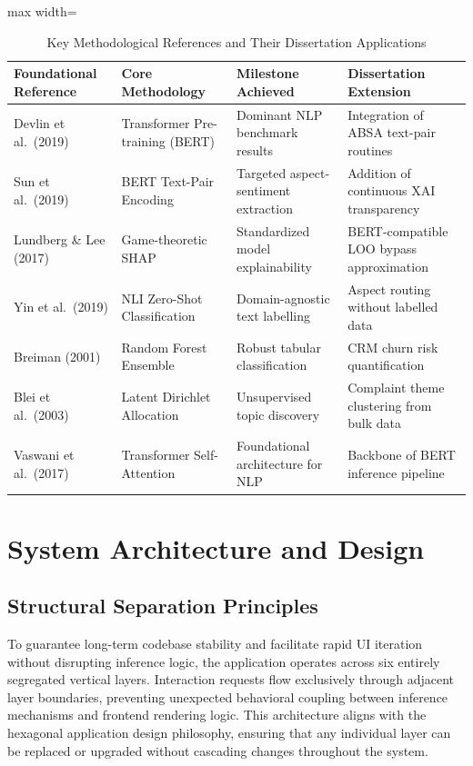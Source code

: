 \documentclass[12pt,a4paper]{report}
\begin{document}
\begin{table}[H]
\centering
\caption{Key Methodological References and Their Dissertation Applications}
\label{tab:litsurvey}
\begin{adjustbox}{max width=\textwidth}
\begin{tabular}{@{}p{4.5cm}p{3.2cm}p{4.0cm}p{4.0cm}@{}}
\toprule
\textbf{Foundational Reference} & \textbf{Core Methodology} & \textbf{Milestone Achieved} & \textbf{Dissertation Extension} \\
\midrule
Devlin et al.\ (2019) & Transformer Pre-training (BERT) & Dominant NLP benchmark results & Integration of ABSA text-pair routines \\[4pt]
Sun et al.\ (2019) & BERT Text-Pair Encoding & Targeted aspect-sentiment extraction & Addition of continuous XAI transparency \\[4pt]
Lundberg \& Lee (2017) & Game-theoretic SHAP & Standardized model explainability & BERT-compatible LOO bypass approximation \\[4pt]
Yin et al.\ (2019) & NLI Zero-Shot Classification & Domain-agnostic text labelling & Aspect routing without labelled data \\[4pt]
Breiman (2001) & Random Forest Ensemble & Robust tabular classification & CRM churn risk quantification \\[4pt]
Blei et al.\ (2003) & Latent Dirichlet Allocation & Unsupervised topic discovery & Complaint theme clustering from bulk data \\[4pt]
Vaswani et al.\ (2017) & Transformer Self-Attention & Foundational architecture for NLP & Backbone of BERT inference pipeline \\
\bottomrule
\end{tabular}
\end{adjustbox}
\end{table}

\chapter{System Architecture and Design}

\section{Structural Separation Principles}
To guarantee long-term codebase stability and facilitate rapid UI iteration without disrupting inference logic, the application operates across six entirely segregated vertical layers. Interaction requests flow exclusively through adjacent layer boundaries, preventing unexpected behavioral coupling between inference mechanisms and frontend rendering logic. This architecture aligns with the hexagonal application design philosophy, ensuring that any individual layer can be replaced or upgraded without cascading changes throughout the system.
\end{document}
